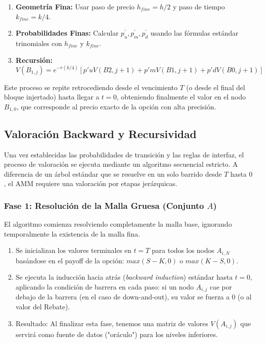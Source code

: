 \begin{enumerate} 
  \item \textbf{Geometría Fina:} Usar paso de precio $h_{fine}=h/2$ y paso de tiempo $k_{fine}=k/4$.
  
  \item \textbf{Probabilidades Finas:} Calcular $p_u^\prime,p_m^\prime, p_d^\prime$ usando las fórmulas estándar trinomiales con $h_{fine}$ y $k_{fine}$.

  \item \textbf{Recursión:} 
  \begin{equation} 
    V(B_{1,j}) = e^{-r(k/4)} \left[ p'u V(B{2, j+1}) + p'm V(B{1, j+1}) + p'd V(B{0, j+1}) \right] 
  \end{equation}
\end{enumerate}

Este proceso se repite retrocediendo desde el vencimiento $T$ (o desde el final del bloque injertado) hasta llegar a $t=0$, obteniendo finalmente el valor en el nodo $B_{1,0}$, que corresponde al precio exacto de la opción con alta precisión.

\subsection{Valoración Backward y Recursividad}

Una vez establecidas las probabilidades de transición y las reglas de interfaz, el proceso de valoración se ejecuta mediante un algoritmo secuencial estricto. A diferencia de un árbol estándar que se resuelve en un solo barrido desde $T$ hasta $0$, el AMM requiere una valoración por etapas jerárquicas.

\subsubsection{Fase 1: Resolución de la Malla Gruesa (Conjunto $A$)} 

El algoritmo comienza resolviendo completamente la malla base, ignorando temporalmente la existencia de la malla fina. 

\begin{enumerate} 
  \item Se inicializan los valores terminales en $t=T$ para todos los nodos $A_{i,N}$ basándose en el payoff de la opción: $max(S-K,0)$ o $max(K-S,0)$. 
  
  \item Se ejecuta la inducción hacia atrás (\textit{backward induction}) estándar hasta $t=0$, aplicando la condición de barrera en cada paso: si un nodo $A_{i,j}$ cae por debajo de la barrera (en el caso de down-and-out), su valor se fuerza a $0$ (o al valor del Rebate). 
  
  \item Resultado: Al finalizar esta fase, tenemos una matriz de valores $V(A_{i,j})$ que servirá como fuente de datos ("oráculo") para los niveles inferiores. 
\end{enumerate}

